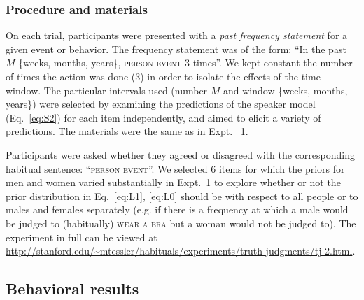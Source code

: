 \documentclass[10pt,letterpaper]{article}
\begin{document}
\subsubsection{Procedure and materials}

On each trial, participants were presented with a \emph{past frequency statement} for a given event or behavior. 
The frequency statement was of the form: ``In the past $M$ \{weeks, months, years\}, \textsc{person} \textsc{event} 3 times''.
We kept constant the number of times the action was done (3) in order to isolate the effects of the time window. 
The particular intervals used (number $M$ and window \{weeks, months, years\}) were selected by examining the predictions of the speaker model (Eq.~\ref{eq:S2}) for each item independently, and aimed to elicit a variety of predictions.
The materials were the same as in Expt. ~1.

Participants were asked whether they agreed or disagreed with the corresponding habitual sentence: ``\textsc{person event}''.
We selected 6 items for which the priors for men and women varied substantially in Expt.~1 to explore whether or not the prior distribution in Eq.~\ref{eq:L1}, \ref{eq:L0} should be with respect to all people or to males and females separately (e.g. if there is a frequency at which a male would be judged to (habitually) \textsc{wear a bra} but a woman would not be judged to). 
The experiment in full can be viewed at \url{http://stanford.edu/~mtessler/habituals/experiments/truth-judgments/tj-2.html}.



\subsection{Behavioral results}
\end{document}
